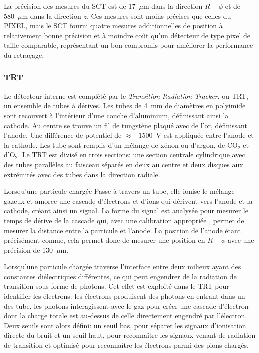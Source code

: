 La précision des mesures du SCT est de 17~$\mu$m dans la direction
$R-\phi$ et de 580~$\mu$m dans la direction $z$. Ces mesures sont
moins précises que celles du PIXEL, mais le SCT fourni quatre mesures
additionnelles de position à relativement bonne précision et à moindre
coût qu'un détecteur de type pixel de taille comparable, représentant
un bon compromis pour améliorer la performance du retraçage.



\subsubsection{TRT}

Le détecteur interne est complété par le \emph{Transition Radiation
  Tracker}, ou TRT, un ensemble de tubes à dérives. Les tubes de 4~mm
de diamètres en polyimide sont recouvert à l'intérieur d'une couche
d'aluminium, définissant ainsi la cathode. Au centre se trouve un fil
de tungstène plaqué avec de l'or, définissant l'anode. Une différence
de potentiel de $\approx -1500$~V est appliquée entre l'anode et la
cathode. Les tube sont remplis d'un mélange de xénon ou d'argon, de
CO$_2$ et d'O$_2$. Le TRT est divisé en trois sections:
une section centrale cylindrique avec des tubes parallèles au faisceau
séparés en deux au centre et deux disques aux extrémités avec des
tubes dans la direction radiale.

Lorsqu'une particule chargée Passe à travers un tube, elle ionise le
mélange gazeux et amorce une cascade d'électrons et d'ions qui
dérivent vers l'anode et la cathode, créant ainsi un signal. La forme
du signal est analysée pour mesurer le temps de dérive de la cascade
qui, avec une calibration appropriée %
,
permet de mesurer la distance entre la particule et l'anode. La
position de l'anode étant précisément connue, cela permet donc de
mesurer une position en $R-\phi$ avec une précision de 130~$\mu$m.


Lorsqu'une particule chargée traverse l'interface entre deux milieux
ayant des constantes diélectriques différentes, ce qui peut engendrer
de la radiation de transition sous forme de photons. Cet effet est
exploité dans le TRT pour identifier les électrons: les électrons
produisent des photons en entrant dans un des tube, les photons
interagissent avec le gaz pour créer une cascade d'électron dont la
charge totale est au-dessus de celle directement engendré par
l'électron. Deux seuils sont alors défini: un seuil bas, pour séparer
les signaux d'ionisation directe du bruit et un seuil haut, pour
reconnaître les signaux venant de radiation de transition et optimisé
pour reconnaître les électrons parmi des pions chargés.

